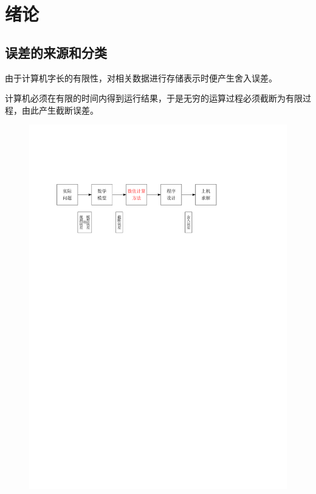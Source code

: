 \section{绪论}
\subsection{误差的来源和分类}
\begin{definition}[舍入误差]
    由于计算机字长的有限性，对相关数据进行存储表示时便产生舍入误差。
\end{definition}
\begin{definition}[截断误差]
    计算机必须在有限的时间内得到运行结果，于是无穷的运算过程必须截断为有限过程，由此产生截断误差。
\end{definition}
\begin{figure}[htbp]
    \centering
    \includegraphics{image/误差.pdf}
\end{figure}

